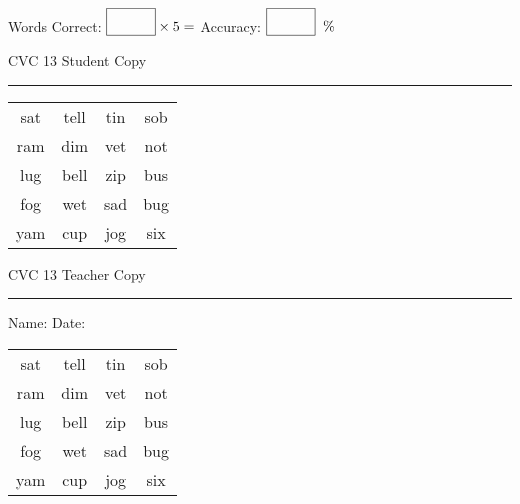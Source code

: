 \documentclass{memoir}
\begin{document}
\normalsize

Words Correct: $\fbox{\phantom{\huge 100}} \times 5 = $ Accuracy: $\fbox{\phantom{\huge 100}}\;\; \%$ 

\vfill

\newpage


\footnotesize \noindent
CVC 13 \hfill Student Copy
\smallskip
\hrule

\huge

\setlength{\tabcolsep}{14pt}
\def\arraystretch{2}

{\selectfont


\begin{vplace}[0.5]
\begin{center}
\begin{tabular}{cccc}
sat & tell & tin & sob \\
ram & dim & vet & not \\
lug & bell & zip & bus \\
fog & wet & sad & bug \\
yam & cup & jog & six \\
\end{tabular}
\end{center}
\end{vplace}

}

\newpage

\footnotesize \noindent
CVC 13 \hfill Teacher Copy
\smallskip
\hrule

\normalsize

\vfill

\noindent
Name: \underline{\hspace{1.75in}} \hfill Date: \underline{\hspace{1in}}

\huge

{\selectfont


\begin{vplace}[0.5]
\begin{center}
\begin{tabular}{cccc}
sat & tell & tin & sob \\
ram & dim & vet & not \\
lug & bell & zip & bus \\
fog & wet & sad & bug \\
yam & cup & jog & six \\
\end{tabular}
\end{center}
\end{vplace}



}
\end{document}
